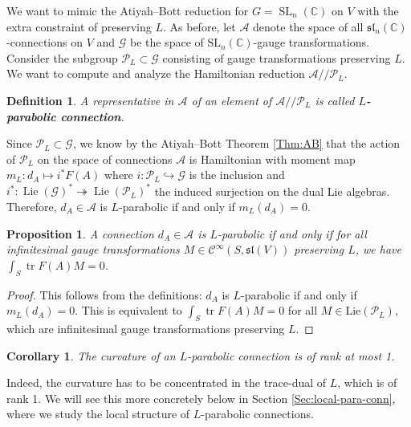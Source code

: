 \documentclass[11pt]{amsart}
\newtheorem{coro}[thm]{Corollary}
\newtheorem{definition}[thm]{Definition}
\newtheorem{prop}[thm]{Proposition}
\numberwithin{thm}{section} %
\numberwithin{equation}{section} %
\numberwithin{figure}{section} %
\newcommand*{\C}{\mathbb{C}}
\renewcommand*{\S}{S}
\DeclareMathOperator{\tr}{tr}
\DeclareMathOperator{\SL}{SL}
\DeclareMathOperator{\Lie}{Lie}
\begin{document}
We want to mimic the Atiyah--Bott reduction for $G=\SL_n(\mathbb{C})$ on $V$ with the extra constraint of preserving $L$. 
As before, let $\mathcal{A}$ denote the space of all $\mathfrak{sl}_n(\C)$-connections on $V$ and $\mathcal{G}$ be the space of $\mathrm{SL}_n(\C)$-gauge transformations. Consider the subgroup $\mathcal{P}_L\subset \mathcal{G}$ consisting of gauge transformations preserving $L$. 
We want to compute and analyze the Hamiltonian reduction $\mathcal{A}//\mathcal{P}_L$. 
\begin{definition}
A representative in $\mathcal{A}$ of an element of $\mathcal{A}//\mathcal{P}_L$ is called \textbf{$L$-parabolic connection}.
\end{definition}

Since $\mathcal{P}_L\subset \mathcal{G}$, we know by the Atiyah--Bott Theorem \ref{Thm:AB} that the action of $\mathcal{P}_L$ on the space of connections $\mathcal{A}$ is Hamiltonian with moment map $m_L: d_A\mapsto i^*F(A)$ where $i: \mathcal{P}_L \hookrightarrow \mathcal{G}$ is the inclusion and $i^*: \Lie(\mathcal{G})^* \twoheadrightarrow \Lie(\mathcal{P}_L)^*$ the induced surjection on the dual Lie algebras. Therefore, $d_A\in\mathcal{A}$ is $L$-parabolic if and only if $m_L(d_A)=0$.

\begin{prop}\label{Prop:L-para-charac}
A connection $d_A\in\mathcal{A}$ is $L$-parabolic if and only if for all infinitesimal gauge transformations $M\in\mathcal{C}^\infty(S,\mathfrak{sl}(V))$ preserving $L$, we have $\int_{\S} \tr F(A)M = 0$.
\end{prop}
\begin{proof}
This follows from the definitions: $d_A$ is $L$-parabolic if and only if $m_L(d_A)=0$. This is equivalent to $\int_{\S} \tr F(A)M=0$ for all $M\in \mathrm{Lie}(\mathcal{P}_L)$, which are infinitesimal gauge transformations preserving $L$.
\end{proof}

\begin{coro}\label{prop:rk-1}
The curvature of an $L$-parabolic connection is of rank at most 1.
\end{coro}
Indeed, the curvature has to be concentrated in the trace-dual of $L$, which is of rank 1. We will see this more concretely below in Section \ref{Sec:local-para-conn}, where we study the local structure of $L$-parabolic connections.
\end{document}
